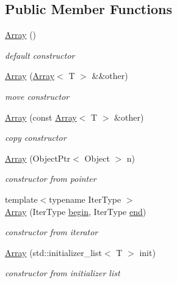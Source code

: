 \subsection*{Public Member Functions}
\begin{DoxyCompactItemize}
\item 
\hyperlink{classtvm_1_1Array_aab72ecf006512069d8f791e3cae3eee0}{Array} ()
\begin{DoxyCompactList}\small\item\em default constructor \end{DoxyCompactList}\item 
\hyperlink{classtvm_1_1Array_a42ad68bcaefafa48967fa815cdb1e9fe}{Array} (\hyperlink{classtvm_1_1Array}{Array}$<$ T $>$ \&\&other)
\begin{DoxyCompactList}\small\item\em move constructor \end{DoxyCompactList}\item 
\hyperlink{classtvm_1_1Array_a48ecf47f2a0bc8dfaddc8da83300deed}{Array} (const \hyperlink{classtvm_1_1Array}{Array}$<$ T $>$ \&other)
\begin{DoxyCompactList}\small\item\em copy constructor \end{DoxyCompactList}\item 
\hyperlink{classtvm_1_1Array_abda937076918f8123b1fc62303a940a4}{Array} (Object\+Ptr$<$ Object $>$ n)
\begin{DoxyCompactList}\small\item\em constructor from pointer \end{DoxyCompactList}\item 
{\footnotesize template$<$typename Iter\+Type $>$ }\\\hyperlink{classtvm_1_1Array_a8e465f5428bc1189dfd6eaf7075bb96f}{Array} (Iter\+Type \hyperlink{classtvm_1_1Array_a5db0d3faad39ca865162e50d555a25fa}{begin}, Iter\+Type \hyperlink{classtvm_1_1Array_a6f05e6a14eca3ea865da0f293b4a5325}{end})
\begin{DoxyCompactList}\small\item\em constructor from iterator \end{DoxyCompactList}\item 
\hyperlink{classtvm_1_1Array_a9cd4b1d4c96884994152797a15df7343}{Array} (std\+::initializer\+\_\+list$<$ T $>$ init)
\begin{DoxyCompactList}\small\item\em constructor from initializer list \end{DoxyCompactList}\item 

\end{DoxyCompactItemize}
